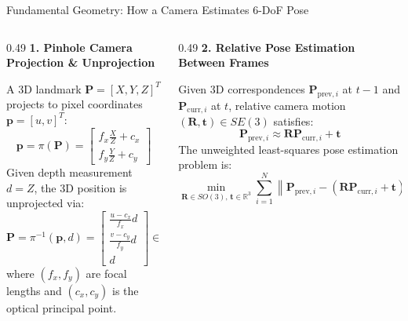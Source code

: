 \documentclass[aspectratio=169, 10pt]{beamer}
\begin{document}
\begin{frame}{Fundamental Geometry: How a Camera Estimates 6-DoF Pose}
  \begin{columns}[T]
    \begin{column}{0.49\textwidth}
      {\small \textbf{\textcolor{NavyBlue}{1. Pinhole Camera Projection \& Unprojection}}}
      \vspace{0.1cm}

      A 3D landmark $\mathbf{P} = [X, Y, Z]^T$ projects to pixel coordinates $\mathbf{p} = [u, v]^T$:
      \begin{equation}
        \mathbf{p} = \pi(\mathbf{P}) = \begin{bmatrix} f_x \frac{X}{Z} + c_x \\[3pt] f_y \frac{Y}{Z} + c_y \end{bmatrix}
      \end{equation}
      Given depth measurement $d = Z$, the 3D position is unprojected via:
      \begin{equation}
        \mathbf{P} = \pi^{-1}(\mathbf{p}, d) = \begin{bmatrix} \frac{u - c_x}{f_x} d \\[3pt] \frac{v - c_y}{f_y} d \\[3pt] d \end{bmatrix} \in \mathbb{R}^3
      \end{equation}
      \vspace{0.05cm}
      where $(f_x, f_y)$ are focal lengths and $(c_x, c_y)$ is the optical principal point.
    \end{column}

    \begin{column}{0.49\textwidth}
      {\small \textbf{\textcolor{NavyBlue}{2. Relative Pose Estimation Between Frames}}}
      \vspace{0.1cm}

      Given 3D correspondences $\mathbf{P}_{\text{prev}, i}$ at $t-1$ and $\mathbf{P}_{\text{curr}, i}$ at $t$, relative camera motion $(\mathbf{R}, \mathbf{t}) \in SE(3)$ satisfies:
      \begin{equation}
        \mathbf{P}_{\text{prev}, i} \approx \mathbf{R} \mathbf{P}_{\text{curr}, i} + \mathbf{t}
      \end{equation}
      The unweighted least-squares pose estimation problem is:
      \begin{equation}
        \min_{\mathbf{R} \in SO(3), \, \mathbf{t} \in \mathbb{R}^3} \sum_{i=1}^N \left\| \mathbf{P}_{\text{prev}, i} - (\mathbf{R} \mathbf{P}_{\text{curr}, i} + \mathbf{t}) \right\|^2
      \end{equation}


\end{column}
\end{columns}
\end{frame}
\end{document}
